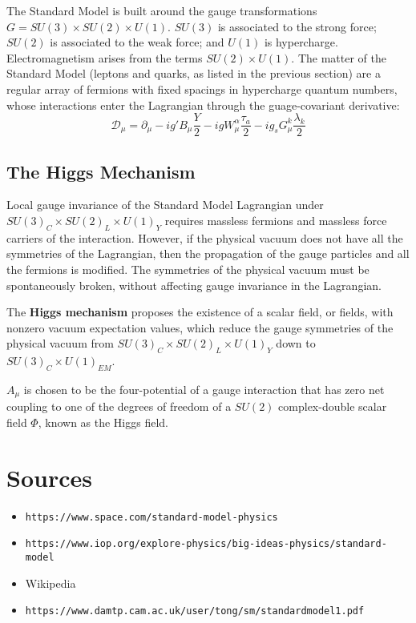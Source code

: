 \documentclass{article}
\begin{document}
The Standard Model is built around the gauge transformations $G = SU(3) \times SU(2) \times U(1)$. $SU(3)$ is associated to the strong force; $SU(2)$ is associated to the weak force; and $U(1)$ is hypercharge. Electromagnetism arises from the terms $SU(2) \times U(1)$. The matter of the Standard Model (leptons and quarks, as listed in the previous section) are a regular array of fermions with fixed spacings in hypercharge quantum numbers, whose interactions enter the Lagrangian through the guage-covariant derivative:
\begin{equation}
    \mathcal{D}_\mu = \partial_\mu - ig' B_\mu \frac{Y}{2} - ig W_{\mu}^{\alpha} \frac{\tau_a}{2} - ig_s G_\mu^{k} \frac{\lambda_k}{2}
\end{equation}

\subsection{The Higgs Mechanism}
Local gauge invariance of the Standard Model Lagrangian under $SU(3)_C \times SU(2)_L \times U(1)_Y$ requires massless fermions and massless force carriers of the interaction. However, if the physical vacuum does not have all the symmetries of the Lagrangian, then the propagation of the gauge particles and all the fermions is modified. The symmetries of the physical vacuum must be spontaneously broken, without affecting gauge invariance in the Lagrangian. 

The \textbf{Higgs mechanism} proposes the existence of a scalar field, or fields, with nonzero vacuum expectation values, which reduce the gauge symmetries of the physical vacuum from $SU(3)_C \times SU(2)_L \times U(1)_Y$ down to $SU(3)_C \times U(1)_{EM}$. 

$A_\mu$ is chosen to be the four-potential of a gauge interaction that has zero net coupling to one of the degrees of freedom of a $SU(2)$ complex-double scalar field $\Phi$, known as the Higgs field.



\section{Sources}

    \begin{itemize}
        \item \texttt{https://www.space.com/standard-model-physics}
        \item \texttt{https://www.iop.org/explore-physics/big-ideas-physics/standard-model}
        \item Wikipedia
        \item \texttt{https://www.damtp.cam.ac.uk/user/tong/sm/standardmodel1.pdf}
    \end{itemize}
\end{document}
